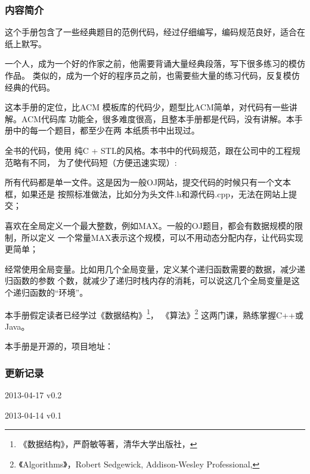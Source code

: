 \subsubsection{内容简介}
这个手册包含了一些经典题目的范例代码，经过仔细编写，编码规范良好，适合在纸上默写。

一个人，成为一个好的作家之前，他需要背诵大量经典段落，写下很多练习的模仿作品。
类似的，成为一个好的程序员之前，也需要些大量的练习代码，反复模仿经典的代码。

这本手册的定位，比ACM 模板库的代码少，题型比ACM简单，对代码有一些讲解。ACM代码库
功能全，很多难度很高，且整本手册都是代码，没有讲解。本手册中的每一个题目，都至少在两
本纸质书中出现过。

全书的代码，使用 纯C + STL的风格。本书中的代码规范，跟在公司中的工程规范略有不同，
为了使代码短（方便迅速实现）:

\begindot
\item 所有代码都是单一文件。这是因为一般OJ网站，提交代码的时候只有一个文本框，如果还是
按照标准做法，比如分为头文件.h和源代码.cpp，无法在网站上提交；

\item 喜欢在全局定义一个最大整数，例如MAX。一般的OJ题目，都会有数据规模的限制，所以定义
一个常量MAX表示这个规模，可以不用动态分配内存，让代码实现更简单；

\item 经常使用全局变量。比如用几个全局变量，定义某个递归函数需要的数据，减少递归函数的参数
个数，就减少了递归时栈内存的消耗，可以说这几个全局变量是这个递归函数的“环境”。
\myenddot

本手册假定读者已经学过《数据结构》\footnote{《数据结构》，严蔚敏等著，清华大学出版社，
}，
《算法》\footnote{《Algorithms》，Robert Sedgewick, Addison-Wesley Professional, }
这两门课，熟练掌握C++或Java。

本手册是开源的，项目地址：


\subsubsection{更新记录}
\begindot
\item[] 2013-04-17 v0.2
\item[] 2013-04-14 v0.1
\myenddot
